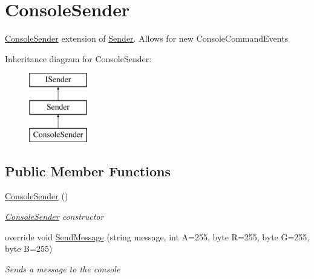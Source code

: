 \hypertarget{classOTA_1_1Command_1_1ConsoleSender}{}\section{Console\+Sender}
\label{classOTA_1_1Command_1_1ConsoleSender}


\hyperlink{classOTA_1_1Command_1_1ConsoleSender}{Console\+Sender} extension of \hyperlink{classOTA_1_1Command_1_1Sender}{Sender}. Allows for new Console\+Command\+Events  


Inheritance diagram for Console\+Sender\+:\begin{figure}[H]
\begin{center}
\leavevmode
\includegraphics[height=3.000000cm]{classOTA_1_1Command_1_1ConsoleSender}
\end{center}
\end{figure}
\subsection*{Public Member Functions}
\begin{DoxyCompactItemize}
\item 
\hyperlink{classOTA_1_1Command_1_1ConsoleSender_a9e8a53f8e4474d7ad93e7fdc993baa87}{Console\+Sender} ()
\begin{DoxyCompactList}\small\item\em \hyperlink{classOTA_1_1Command_1_1ConsoleSender}{Console\+Sender} constructor \end{DoxyCompactList}\item 
override void \hyperlink{classOTA_1_1Command_1_1ConsoleSender_a39f7a740cc58640c8502e2159e5c724d}{Send\+Message} (string message, int A=255, byte R=255, byte G=255, byte B=255)
\begin{DoxyCompactList}\small\item\em Sends a message to the console \end{DoxyCompactList}\end{DoxyCompactItemize}
